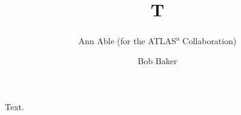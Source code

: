\documentclass{article}
\begin{document}
\title{T}\author{Ann Able (for the ATLAS\textsuperscript{a} Collaboration) \and Bob Baker}
\maketitle
Text.
\end{document}

